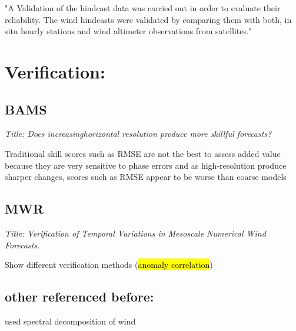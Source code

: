 \documentclass[12pt,a4paper]{article}
\begin{document}
"A Validation of the hindcast data was carried out in order to evaluate their reliability. The wind hindcasts were validated by comparing them with both, in situ hourly stations and wind altimeter observations from satellites."

\section{Verification:}

\subsection{\cite{Mass2002} BAMS}

\textit{Title: Does increasinghorizontal resolution produce more skillful forecasts?}

Traditional skill scores such as RMSE are not the best to assess added value because they are very sensitive to phase errors and as high-resolution produce sharper changes, scores such as RMSE appear to be worse than coarse models

\subsection{\cite{Rife2005} MWR}

\textit{Title: Verification of Temporal Variations in Mesoscale Numerical Wind Forecasts.}

Show different verification methods (\hl{anomaly correlation})

\subsection{other referenced before:}

\cite{Garcia-Diez2015} 

\cite{Winterfeldt2009}

\cite{Horvath2011} used spectral decomposition of wind


\printglossaries


\label{sec:references}
\end{document}
